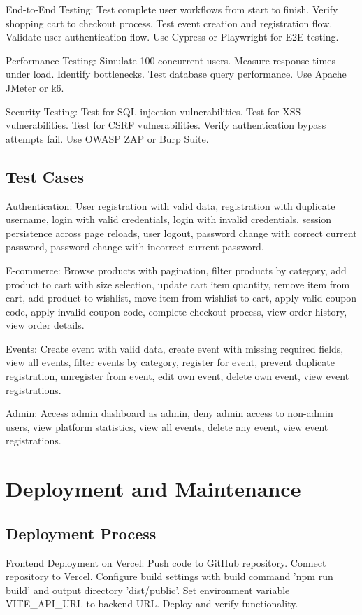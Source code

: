 ﻿\documentclass[11pt]{article}
\begin{document}
End-to-End Testing: Test complete user workflows from start to finish. Verify shopping cart to checkout process. Test event creation and registration flow. Validate user authentication flow. Use Cypress or Playwright for E2E testing.

Performance Testing: Simulate 100 concurrent users. Measure response times under load. Identify bottlenecks. Test database query performance. Use Apache JMeter or k6.

Security Testing: Test for SQL injection vulnerabilities. Test for XSS vulnerabilities. Test for CSRF vulnerabilities. Verify authentication bypass attempts fail. Use OWASP ZAP or Burp Suite.

\subsection{Test Cases}
Authentication: User registration with valid data, registration with duplicate username, login with valid credentials, login with invalid credentials, session persistence across page reloads, user logout, password change with correct current password, password change with incorrect current password.

E-commerce: Browse products with pagination, filter products by category, add product to cart with size selection, update cart item quantity, remove item from cart, add product to wishlist, move item from wishlist to cart, apply valid coupon code, apply invalid coupon code, complete checkout process, view order history, view order details.

Events: Create event with valid data, create event with missing required fields, view all events, filter events by category, register for event, prevent duplicate registration, unregister from event, edit own event, delete own event, view event registrations.

Admin: Access admin dashboard as admin, deny admin access to non-admin users, view platform statistics, view all events, delete any event, view event registrations.

\section{Deployment and Maintenance}

\subsection{Deployment Process}
Frontend Deployment on Vercel: Push code to GitHub repository. Connect repository to Vercel. Configure build settings with build command 'npm run build' and output directory 'dist/public'. Set environment variable VITE\_API\_URL to backend URL. Deploy and verify functionality.
\end{document}

